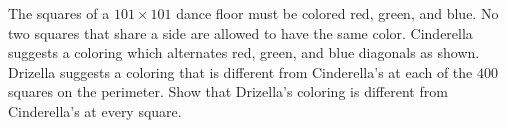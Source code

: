 The squares of a $101\times101$ dance floor must be colored red, green, and blue. No two squares that share a side are allowed to have the same color. Cinderella suggests a coloring which alternates red, green, and blue diagonals as shown. Drizella suggests a coloring that is different from Cinderella's at each of the $400$ squares on the perimeter. Show that Drizella's coloring is different from Cinderella's at every square.
